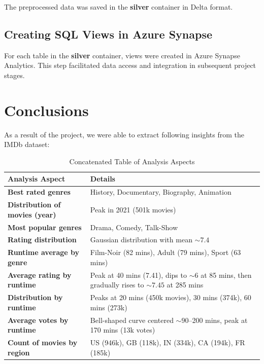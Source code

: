 \documentclass[a4paper,12pt]{article}
\begin{document}
The preprocessed data was saved in the \textbf{silver} container in Delta format.

\subsection{Creating SQL Views in Azure Synapse}

For each table in the \textbf{silver} container, views were created in Azure Synapse Analytics. This step facilitated data access and integration in subsequent project stages.

\section{Conclusions}
\label{sec:conclusions}

As a result of the project, we were able to extract following insights from the IMDb dataset:

\begin{table}[ht]
    \centering
    \begin{tabular}{|l|p{10cm}|}
    \hline
    \textbf{Analysis Aspect} & \textbf{Details} \\
    \hline
    \textbf{Best rated genres} & History, Documentary, Biography, Animation \\
    \hline
    \textbf{Distribution of movies (year)} & Peak in 2021 (501k movies) \\
    \hline
    \textbf{Most popular genres} & Drama, Comedy, Talk-Show \\
    \hline
    \textbf{Rating distribution} & Gaussian distribution with mean \(\sim 7.4\) \\
    \hline
    \textbf{Runtime average by genre} & Film-Noir (82 mins), Adult (79 mins), Sport (63 mins) \\
    \hline
    \textbf{Average rating by runtime} & Peak at 40 mins (7.41), dips to \(\sim 6\) at 85 mins, then gradually rises to \(\sim 7.45\) at 285 mins \\
    \hline
    \textbf{Distribution by runtime} & Peaks at 20 mins (450k movies), 30 mins (374k), 60 mins (273k) \\
    \hline
    \textbf{Average votes by runtime} & Bell-shaped curve centered \(\sim 90\)–200 mins, peak at 170 mins (13k votes) \\
    \hline
    \textbf{Count of movies by region} & US (946k), GB (118k), IN (334k), CA (194k), FR (185k) \\
    \hline
    \end{tabular}
    \caption{Concatenated Table of Analysis Aspects}
    \label{tab:analysis_aspects}
\end{table}
    
\end{document}
